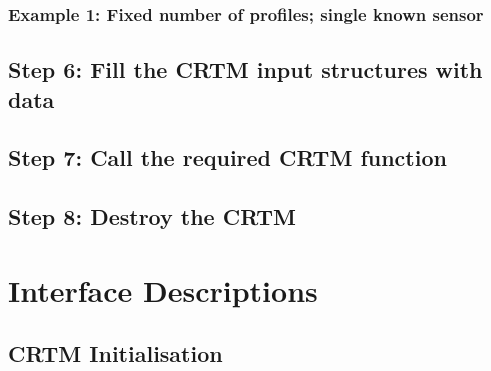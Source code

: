 \subsubsection{Example 1: Fixed number of profiles; single known sensor}


\subsection{Step 6: Fill the CRTM input structures with data}


\subsection{Step 7: Call the required CRTM function}


\subsection{Step 8: Destroy the CRTM}



\section{Interface Descriptions}

\subsection{CRTM Initialisation}

